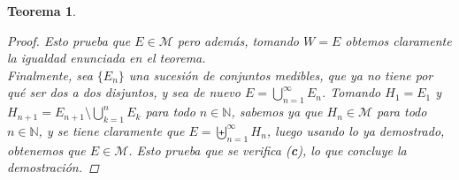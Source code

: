 \documentclass[a4paper, 12pt]{article}
\newtheorem{teorema}{Teorema}
\begin{document}
\begin{enumerate}[label=\textbf{\arabic*}.]
\begin{teorema}
\begin{proof}
Esto prueba que \(E \in \mathcal{M}\) pero además, tomando \(W = E\) obtemos claramente la igualdad enunciada en el teorema. \\

Finalmente, sea \(\{E_n\}\) una sucesión de conjuntos medibles, que ya no tiene por qué ser dos a dos disjuntos, y sea de nuevo \(E = \bigcup_{n= 1}^{\infty} E_n\). Tomando \(H_1 = E_1\) y \(H_{n+1} = E_{n+1} \setminus \bigcup_{k=1}^{n} E_k\) para todo \(n \in \mathbb{N}\), sabemos ya que \(H_n \in \mathcal{M}\) para todo \(n \in \mathbb{N}\), y se tiene claramente que \(E = \biguplus_{n=1}^{\infty} H_n\), luego usando lo ya demostrado, obtenemos que \(E \in \mathcal{M}\). Esto prueba que se verifica (\textbf{c}), lo que concluye la demostración.
\end{proof}
\end{teorema}
	
\end{enumerate}
\end{document}
